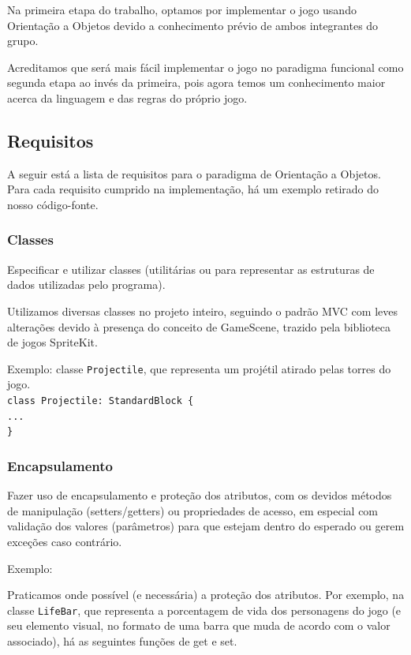 \documentclass[rel_mlp]{iiufrgs}
\newcommand\tab[1][1cm]{\hspace*{#1}}
\begin{document}
Na primeira etapa do trabalho, optamos por implementar o jogo usando Orientação a Objetos devido a conhecimento prévio de ambos integrantes do grupo.

Acreditamos que será mais fácil implementar o jogo no paradigma funcional como segunda etapa ao invés da primeira, pois agora temos um conhecimento maior acerca da linguagem e das regras do próprio jogo.

\subsection{Requisitos}

A seguir está a lista de requisitos para o paradigma de Orientação a Objetos. Para cada requisito cumprido na implementação, há um exemplo retirado do nosso código-fonte.

\subsubsection{Classes}

Especificar e utilizar classes (utilitárias ou para representar as estruturas de dados utilizadas pelo programa).

Utilizamos diversas classes no projeto inteiro, seguindo o padrão MVC com leves alterações devido à presença do conceito de GameScene, trazido pela biblioteca de jogos SpriteKit.

Exemplo: classe \texttt{Projectile}, que representa um projétil atirado pelas torres do jogo.
\texttt{\\class Projectile: StandardBlock \{\\\tab ...\\\}}


\subsubsection{Encapsulamento}

Fazer uso de encapsulamento e proteção dos atributos, com os devidos métodos de manipulação (setters/getters) ou propriedades de acesso, em especial com validação dos valores (parâmetros) para que estejam dentro do esperado ou gerem exceções caso contrário.

Exemplo:

Praticamos onde possível (e necessária) a proteção dos atributos. Por exemplo, na classe \texttt{LifeBar}, que representa a porcentagem de vida dos personagens do jogo (e seu elemento visual, no formato de uma barra que muda de acordo com o valor associado), há as seguintes funções de get e set.
\end{document}
